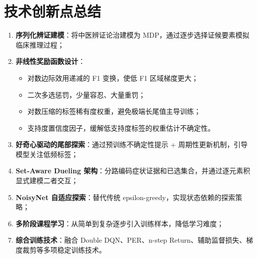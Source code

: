 \documentclass[12pt,a4paper]{article}
\begin{document}
\section{技术创新点总结}

\begin{enumerate}[label=(\arabic*)]
    \item \textbf{序列化辨证建模}：将中医辨证论治建模为 MDP，通过逐步选择证候要素模拟临床推理过程；
    \item \textbf{非线性奖励函数设计}：
    \begin{itemize}
        \item 对数边际效用递减的 F1 变换，使低 F1 区域梯度更大；
        \item 二次多选惩罚，少量容忍、大量重罚；
        \item 对数压缩的标签稀有度权重，避免极端长尾值主导训练；
        \item 支持度置信度因子，缓解低支持度标签的权重估计不确定性。
    \end{itemize}
    \item \textbf{好奇心驱动的尾部探索}：通过预训练不确定性提示 + 周期性更新机制，引导模型关注低频标签；
    \item \textbf{Set-Aware Dueling 架构}：分路编码症状证据和已选集合，并通过逐元素积显式建模二者交互；
    \item \textbf{NoisyNet 自适应探索}：替代传统 epsilon-greedy，实现状态依赖的探索策略；
    \item \textbf{多阶段课程学习}：从简单到复杂逐步引入训练样本，降低学习难度；
    \item \textbf{综合训练技术}：融合 Double DQN、PER、n-step Return、辅助监督损失、梯度裁剪等多项稳定训练技术。
\end{enumerate}
\end{document}
